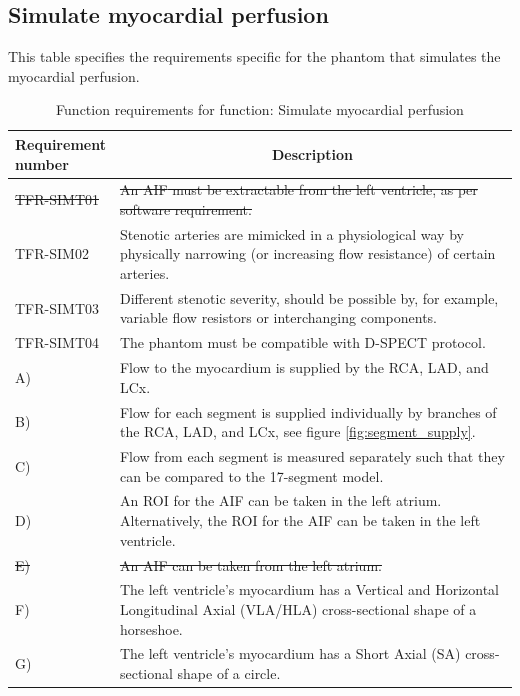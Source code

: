 \subsection{Simulate myocardial perfusion}
\begin{table} [H]
\caption{Function requirements for function: Simulate myocardial perfusion}
\label{tab:funcsim}
This table specifies the requirements specific for the phantom that simulates the myocardial perfusion.
\begin{tabular}{l|p{120mm}|}
	\makecell[l]{\textbf{Requirement} \\  \textbf{number}} & \multicolumn{1}{c}{\textbf{Description}}\\
	\hline
	\sout{TFR-SIMT01} & \sout{An \ac{AIF} must be extractable from the left ventricle, as per software requirement.}\\
	TFR-SIM02 & Stenotic arteries are mimicked in a physiological way by physically narrowing (or increasing flow resistance) of certain arteries. \\
	TFR-SIMT03 & Different stenotic severity, should be possible by, for example, variable flow resistors or interchanging components. \\
	TFR-SIMT04 & The phantom must be compatible with D-SPECT protocol. \\
	\hspace{1.5cm} A) & Flow to the myocardium is supplied by the RCA, LAD, and LCx. \\
	\hspace{1.5cm} B) & Flow for each segment is supplied individually by branches of the RCA, LAD, and LCx, see figure \ref{fig:segment_supply}. \\
	\hspace{1.5cm} C) & Flow from each segment is measured separately such that they can be compared to the 17-segment model. \\
	\hspace{1.5cm} D) & An ROI for the AIF can be taken in the left atrium. Alternatively, the ROI for the AIF can be taken in the left ventricle. \\
	\hspace{1.5cm} \sout{E)} & \sout{An AIF can be taken from the left atrium.} \\
	\hspace{1.5cm} F) & The left ventricle's myocardium has a Vertical and Horizontal Longitudinal Axial (VLA/HLA) cross-sectional shape of a horseshoe. \\
	\hspace{1.5cm} G) & The left ventricle's myocardium has a Short Axial (SA) cross-sectional shape of a circle. \\

\end{tabular}
\end{table}
